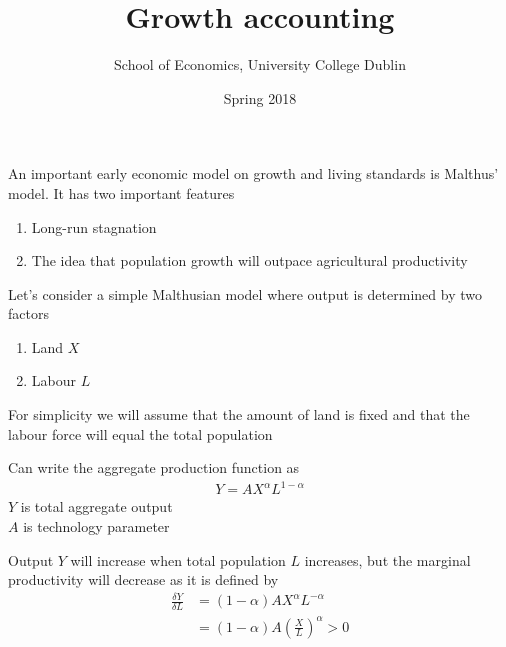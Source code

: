 \documentclass{beamer}
\title{Growth accounting}
\author{School of Economics, University College Dublin}
\date{Spring 2018}
\begin{document}
\begin{frame}
 \titlepage
\end{frame}

\begin{frame}
  An important early economic model on growth and living standards is Malthus' model. 
  It has two important features  
  \begin{enumerate}
    \item Long-run stagnation
    \item The idea that population growth will outpace agricultural productivity
  \end{enumerate}
\end{frame}

\begin{frame}
 Let's consider a simple Malthusian model where output is determined by two factors
 \begin{enumerate}
   \item Land $X$
   \item Labour $L$
 \end{enumerate}
 For simplicity we will assume that the amount of land is fixed and that the labour force will equal the total population
\end{frame}

\begin{frame}
  Can write the aggregate production function as
  \begin{align}
    Y=AX^{\alpha}L^{1-\alpha}
  \end{align}
  \medskip
  $Y$ is total aggregate output\\
  $A$ is technology parameter
\end{frame}

\begin{frame}
  Output $Y$ will increase when total population $L$ increases, but the marginal productivity will decrease as it is defined by
  \begin{align}
    \frac{\delta Y}{\delta L} &= (1-\alpha)AX^{\alpha}L^{-\alpha}\\
  &= (1-\alpha)A \left( \frac{X}{L} \right)^{\alpha} > 0
  \end{align}  
\end{frame}
\end{document}
